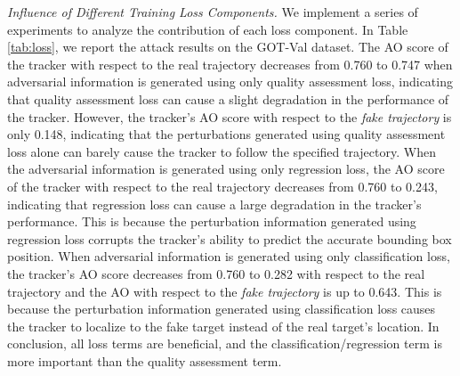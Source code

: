 \documentclass[journal]{IEEEtran}
\begin{document}
\textit{Influence of Different Training Loss Components.} We implement a series of experiments to analyze the contribution of each loss component. In Table \ref{tab:loss}, we report the attack results on the GOT-Val dataset. The AO score of the tracker with respect to the real trajectory decreases from 0.760 to 0.747 when adversarial information is generated using only quality assessment loss, indicating that quality assessment loss can cause a slight degradation in the performance of the tracker.
However, the tracker's AO score with respect to the \textit{fake trajectory} is only 0.148, indicating that the perturbations generated using quality assessment loss alone can barely cause the tracker to follow the specified trajectory. When the adversarial information is generated using only regression loss, the AO score of the tracker with respect to the real trajectory decreases from 0.760 to 0.243, indicating that regression loss can cause a large degradation in the tracker's performance. This is because the perturbation information generated using regression loss corrupts the tracker's ability to predict the accurate bounding box position. When adversarial information is generated using only classification loss, the tracker's AO score decreases from 0.760 to 0.282 with respect to the real trajectory and the AO with respect to the \textit{fake trajectory} is up to 0.643. This is because the perturbation information generated using classification loss causes the tracker to localize to the fake target instead of the real target's location. In conclusion, all loss terms are beneficial, and the classification/regression term is more important than the quality assessment term.
\end{document}
